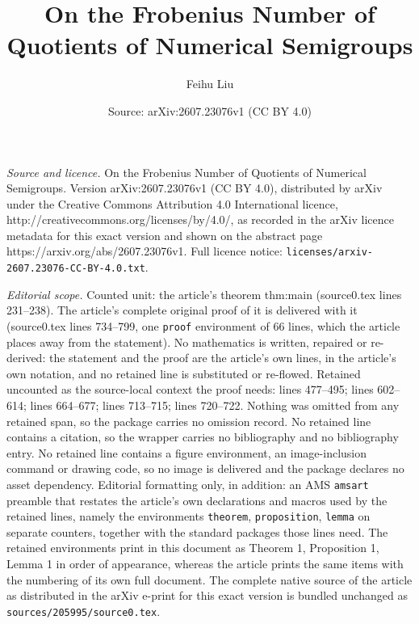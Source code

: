 \documentclass[10pt,a4paper]{amsart}
\title{On the Frobenius Number of Quotients of Numerical Semigroups}
\author{Feihu Liu}
\date{Source: arXiv:2607.23076v1 (CC BY 4.0)}
\begin{document}
\maketitle

\noindent\emph{Source and licence.} On the Frobenius Number of Quotients of Numerical Semigroups. Version arXiv:2607.23076v1 (CC BY 4.0), distributed by arXiv under the Creative Commons Attribution 4.0 International licence, http://creativecommons.org/licenses/by/4.0/, as recorded in the arXiv licence metadata for this exact version and shown on the abstract page https://arxiv.org/abs/2607.23076v1. Full licence notice: \texttt{licenses/arxiv-2607.23076-CC-BY-4.0.txt}.\par\smallskip

\noindent\textit{Editorial scope.} Counted unit: the article's theorem thm:main (source0.tex lines 231--238). The article's complete original proof of it is delivered with it (source0.tex lines 734--799, one \texttt{proof} environment of 66 lines, which the article places away from the statement). No mathematics is written, repaired or re-derived: the statement and the proof are the article's own lines, in the article's own notation, and no retained line is substituted or re-flowed.  Retained uncounted as the source-local context the proof needs: lines 477--495; lines 602--614; lines 664--677; lines 713--715; lines 720--722.  Nothing was omitted from any retained span, so the package carries no omission record.  No retained line contains a citation, so the wrapper carries no bibliography and no bibliography entry.  No retained line contains a figure environment, an image-inclusion command or drawing code, so no image is delivered and the package declares no asset dependency.  Editorial formatting only, in addition: an AMS \texttt{amsart} preamble that restates the article's own declarations and macros used by the retained lines, namely the environments \texttt{theorem}, \texttt{proposition}, \texttt{lemma} on separate counters, together with the standard packages those lines need.  The retained environments print in this document as Theorem 1, Proposition 1, Lemma 1 in order of appearance, whereas the article prints the same items with the numbering of its own full document.  The complete native source of the article as distributed in the arXiv e-print for this exact version is bundled unchanged as \texttt{sources/205995/source0.tex}.
\end{document}

